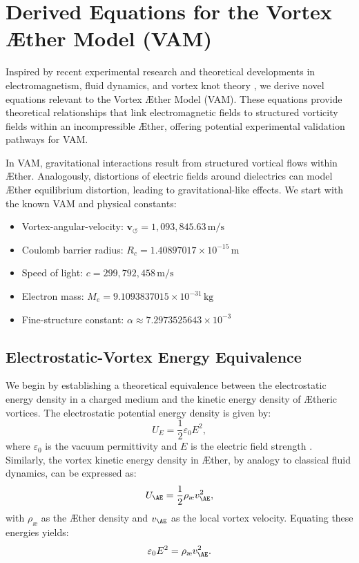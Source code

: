 \documentclass[a4paper,12pt]{article}
\begin{document}

\section{Derived Equations for the Vortex Æther Model (VAM)}
Inspired by recent experimental research and theoretical developments in electromagnetism, fluid dynamics, and vortex knot theory
\cite{Matsoukas2014,Kleckner2013,Ricca1998}, we derive novel equations relevant to the Vortex Æther Model (VAM). These equations provide
theoretical relationships
that link electromagnetic fields to structured vorticity fields within an incompressible Æther, offering potential experimental validation pathways for VAM.

In VAM, gravitational interactions result from structured vortical flows within Æther. Analogously, distortions of electric fields around dielectrics can model Æther equilibrium distortion, leading to gravitational-like effects.
We start with the known VAM and physical constants:

\begin{itemize}
    \item Vortex-angular-velocity: $\mathbf{v}_{\scriptscriptstyle\boldsymbol{\circlearrowleft}} = 1,093,845.63\, \text{m/s}$
    \item Coulomb barrier radius: $R_c = 1.40897017\times10^{-15}\, \text{m}$
    \item Speed of light: $c = 299,792,458\, \text{m/s}$
    \item Electron mass: $M_e = 9.1093837015\times10^{-31}\, \text{kg}$
    \item Fine-structure constant: $\alpha \approx 7.2973525643\times10^{-3}$
\end{itemize}



\subsection{Electrostatic-Vortex Energy Equivalence}
We begin by establishing a theoretical equivalence between the electrostatic energy density in a charged medium and the kinetic energy density of Ætheric vortices. The electrostatic potential energy density is given by:
\begin{equation}
    U_E = \frac{1}{2} \varepsilon_0 E^2,
\end{equation}
where $\varepsilon_0$ is the vacuum permittivity and $E$ is the electric field strength \cite{Matsoukas2014}.
Similarly, the vortex kinetic energy density in Æther, by analogy to classical fluid dynamics, can be expressed as:
\begin{equation}
    U_{\AE} = \frac{1}{2}\rho_\text{\ae} v_{\AE}^2,
\end{equation}
with $\rho_\text{\ae}$ as the Æther density and $v_{\AE}$ as the local vortex velocity.
Equating these energies yields:
\begin{equation}\label{eq:energy_equivalence}
\varepsilon_0 E^2 = \rho_\text{\ae} v_{\AE}^2.
\end{equation}
\end{document}

